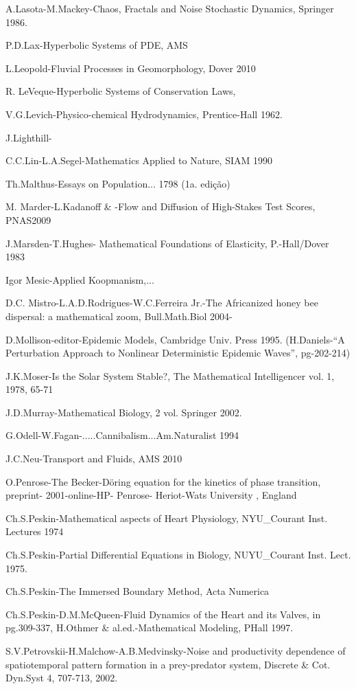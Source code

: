 A.Lasota-M.Mackey-Chaos, Fractals and Noise Stochastic Dynamics, Springer 1986.

P.D.Lax-Hyperbolic Systems of PDE, AMS

L.Leopold-Fluvial Processes in Geomorphology, Dover 2010

R. LeVeque-Hyperbolic Systems of Conservation Laws,

V.G.Levich-Physico-chemical Hydrodynamics, Prentice-Hall 1962.

J.Lighthill-

C.C.Lin-L.A.Segel-Mathematics Applied to Nature, SIAM 1990

Th.Malthus-Essays on Population... 1798 (1a. edição)

M. Marder-L.Kadanoff \& -Flow and Diffusion of High-Stakes Test Scores, PNAS2009

J.Marsden-T.Hughes- Mathematical Foundations of Elasticity, P.-Hall/Dover 1983

Igor Mesic-Applied Koopmanism,...

D.C. Mistro-L.A.D.Rodrigues-W.C.Ferreira Jr.-The Africanized honey bee dispersal: a mathematical zoom, Bull.Math.Biol 2004-

D.Mollison-editor-Epidemic Models, Cambridge Univ. Press 1995. (H.Daniels-``A Perturbation Approach to Nonlinear Deterministic Epidemic Waves'', pg-202-214)

J.K.Moser-Is the Solar System Stable?, The Mathematical Intelligencer vol. 1, 1978, 65-71

J.D.Murray-Mathematical Biology, 2 vol. Springer 2002.

G.Odell-W.Fagan-.....Cannibalism...Am.Naturalist 1994

J.C.Neu-Transport and Fluids, AMS 2010

O.Penrose-The Becker-Döring equation for the kinetics of phase transition, preprint- 2001-online-HP- Penrose- Heriot-Wats University , England

Ch.S.Peskin-Mathematical aspects of Heart Physiology, NYU\_Courant Inst. Lectures 1974

Ch.S.Peskin-Partial Differential Equations in Biology, NUYU\_Courant Inst. Lect. 1975.

Ch.S.Peskin-The Immersed Boundary Method, Acta Numerica

Ch.S.Peskin-D.M.McQueen-Fluid Dynamics of the Heart and its Valves, in pg.309-337, H.Othmer \& al.ed.-Mathematical Modeling, PHall 1997.

S.V.Petrovskii-H.Malchow-A.B.Medvinsky-Noise and productivity dependence of spatiotemporal pattern formation in a prey-predator system, Discrete \& Cot. Dyn.Syst 4, 707-713, 2002.

